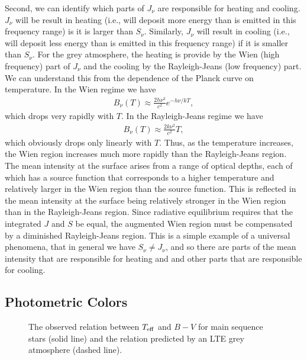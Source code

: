 Second, we can identify which parts of $J_\nu$ are responsible for
heating and cooling. $J_\nu$ will be result in heating (i.e., will
deposit more energy than is emitted in this frequency range) is it is
larger than $S_\nu$. Similarly, $J_\nu$ will result in cooling (i.e.,
will deposit less energy than is emitted in this frequency range) if it
is smaller than $S_\nu$. For the grey atmosphere, the heating is provide
by the Wien (high frequency) part of $J_\nu$ and the cooling by the
Rayleigh-Jeans (low frequency) part. We can understand this from the
dependence of the Planck curve on temperature. In the Wien regime we
have
\begin{align}
B_\nu(T) \approx \frac{2 h\nu^3}{c^2} e^{-h\nu/kT},
\end{align}
which drops very rapidly with $T$. In the Rayleigh-Jeans
regime we have
\begin{align}
B_\nu(T) \approx \frac{2 k \nu^2}{c^2} T,
\end{align}
which obviously drops only linearly with $T$. Thus, as the temperature
increases, the Wien region increases much more rapidly than the
Rayleigh-Jeans region. The mean intensity at the surface arises from a
range of optical depths, each of which has a source function that
corresponds to a higher temperature and relatively larger in the Wien
region than the source function. This is reflected in the mean intensity
at the surface being relatively stronger in the Wien region than in the
Rayleigh-Jeans region. Since radiative equilibrium requires that the
integrated $J$ and $S$ be equal, the augmented Wien region must be
compensated by a diminished Rayleigh-Jeans region. This is a simple
example of a universal phenomena, that in general we have $S_\nu \ne
J_\nu$, and so there are parts of the mean intensity that are
responsible for heating and and other parts that are responsible for
cooling.

\newslide

\subsection{Photometric Colors}

\begin{figure}
\footnotesize
{}
\caption{The observed relation between $T_\mathrm{eff}$ and $B-V$ for
main sequence stars (solid line) and the relation predicted
by an LTE grey atmosphere (dashed line).}
\label{figure-grey-b-v}
\bigskip
\end{figure}


